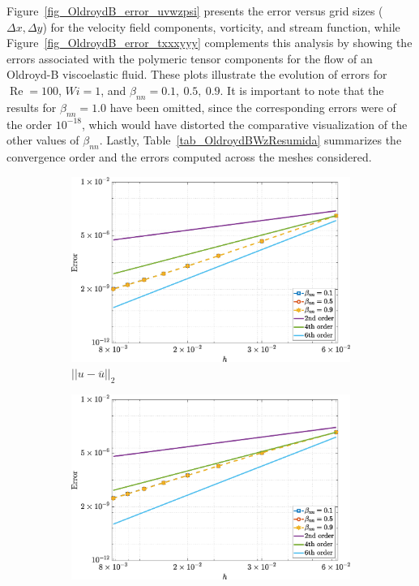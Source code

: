 \documentclass[preprint, 12pt]{elsarticle}
\begin{document}
Figure~\ref{fig_OldroydB_error_uvwzpsi} presents the error versus grid sizes
($\Delta x, \Delta y$) for the velocity field components, vorticity, and stream
function, while Figure~\ref{fig_OldroydB_error_txxxyyy} complements this
analysis by showing the errors associated with the polymeric tensor components
for the flow of an Oldroyd-B viscoelastic fluid. These plots illustrate the
evolution of errors for $\operatorname{Re}=100$, $Wi=1$, and $\beta_{nn}=0.1,\
0.5,\ 0.9$. It is important to note that the results for $\beta_{nn}=1.0$ have
been omitted, since the corresponding errors were of the order $10^{-18}$,
which would have distorted the comparative visualization of the other values of
$\beta_{nn}$. Lastly, Table~\ref{tab_OldroydBWzResumida} summarizes the
convergence order and the errors computed across the meshes considered.
\begin{figure}[H]
    \centering  
    \begin{subfigure}[b]{.46\textwidth}
        \includegraphics[width=\textwidth]{NormErr_2nd_Re_100_Wi_1_epsilon_0_xi_0_alphaG_0_Dt_1e-06_at_0.05_tipsim_1_MMS_12_U.eps}
        \caption{$||u - \overline{u}||_{2}$}
        \label{error_u_2nd_Case1_oldorydb}
    \end{subfigure}
    \vspace{0.2cm}
    \qquad
    \begin{subfigure}[b]{.46\textwidth}
        \includegraphics[width=\textwidth]{NormErr_2nd_Re_100_Wi_1_epsilon_0_xi_0_alphaG_0_Dt_1e-06_at_0.05_tipsim_1_MMS_12_V.eps}

\end{subfigure}
\end{figure}
\end{document}
